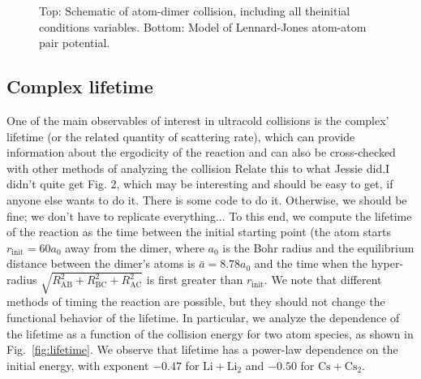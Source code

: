 \documentclass[%
 reprint,
 amsmath,amssymb,
 aps,
10pt
]{revtex4-1}
\begin{document}
\begin{figure}[htp]
\caption{Top: Schematic of atom-dimer collision, including all theinitial conditions variables. Bottom: Model of Lennard-Jones atom-atom pair potential.}
\label{fig:schematic}
\end{figure}

\subsection{\label{sec:level2}Complex lifetime}

One of the main observables of interest in ultracold collisions is the complex' lifetime (or the related quantity of scattering rate), which can provide information about the ergodicity of the reaction and can also be cross-checked with other methods of analyzing the collision  {\color{red}Relate this to what Jessie did.I didn't quite get Fig. 2, which may be interesting and should be easy to get, if anyone else wants to do it. There is some code to do it. Otherwise, we should be fine; we don't have to replicate everything..}. To this end, we compute the lifetime of the reaction as the time between the initial starting point (the atom starts $r_{\mathrm{init}} = 60 a_0$ away from the dimer, where $a_{\mathrm{0}}$ is the Bohr radius and the equilibrium distance between the dimer's atoms is $\bar{a} = 8.78 a_{\mathrm{0}}$ and the time when the hyper-radius $\sqrt{R^2_{\mathrm{AB}} + R^2_{\mathrm{BC}} + R^2_{\mathrm{AC}}}$ is first greater than $ r_{\mathrm{init}}$. We note that different methods of timing the reaction are possible, but they should not change the functional behavior of the lifetime. In particular, we analyze the dependence of the lifetime as a function of the collision energy for two atom species, as shown in Fig.~\ref{fig:lifetime}. We observe that lifetime has a power-law dependence on the initial energy, with exponent $-0.47$ for $\mathrm{Li} + \mathrm{Li_{2}}$ and $-0.50$ for $\mathrm{Cs} + \mathrm{Cs_{2}}$.
\end{document}
